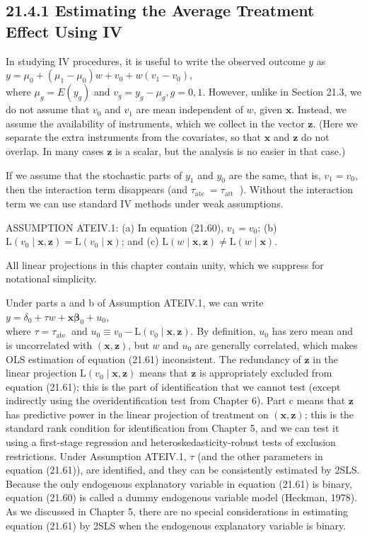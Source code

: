 \documentclass[10pt]{article}
\begin{document}
\subsection*{21.4.1 Estimating the Average Treatment Effect Using IV}
In studying IV procedures, it is useful to write the observed outcome $y$ as\\
$y=\mu_{0}+\left(\mu_{1}-\mu_{0}\right) w+v_{0}+w\left(v_{1}-v_{0}\right)$,\\
where $\mu_{g}=E\left(y_{g}\right)$ and $v_{g}=y_{g}-\mu_{g}, g=0,1$. However, unlike in Section 21.3, we do not assume that $v_{0}$ and $v_{1}$ are mean independent of $w$, given $\mathbf{x}$. Instead, we assume the availability of instruments, which we collect in the vector $\mathbf{z}$. (Here we separate the extra instruments from the covariates, so that $\mathbf{x}$ and $\mathbf{z}$ do not overlap. In many cases $\mathbf{z}$ is a scalar, but the analysis is no easier in that case.)

If we assume that the stochastic parts of $y_{1}$ and $y_{0}$ are the same, that is, $v_{1}=v_{0}$, then the interaction term disappears (and $\tau_{\text {ate }}=\tau_{\text {att }}$ ). Without the interaction term we can use standard IV methods under weak assumptions.

ASSUMPTION ATEIV.1: (a) In equation (21.60), $v_{1}=v_{0}$; (b) $\mathrm{L}\left(v_{0} \mid \mathbf{x}, \mathbf{z}\right)=\mathrm{L}\left(v_{0} \mid \mathbf{x}\right)$; and (c) $\mathrm{L}(w \mid \mathbf{x}, \mathbf{z}) \neq \mathrm{L}(w \mid \mathbf{x})$.

All linear projections in this chapter contain unity, which we suppress for notational simplicity.

Under parts a and b of Assumption ATEIV.1, we can write\\
$y=\delta_{0}+\tau w+\mathbf{x} \boldsymbol{\beta}_{0}+u_{0}$,\\
where $\tau=\tau_{\text {ate }}$ and $u_{0} \equiv v_{0}-\mathrm{L}\left(v_{0} \mid \mathbf{x}, \mathbf{z}\right)$. By definition, $u_{0}$ has zero mean and is uncorrelated with $(\mathbf{x}, \mathbf{z})$, but $w$ and $u_{0}$ are generally correlated, which makes OLS estimation of equation (21.61) inconsistent. The redundancy of $\mathbf{z}$ in the linear projection $\mathrm{L}\left(v_{0} \mid \mathbf{x}, \mathbf{z}\right)$ means that $\mathbf{z}$ is appropriately excluded from equation (21.61); this is the part of identification that we cannot test (except indirectly using the overidentification test from Chapter 6). Part c means that $\mathbf{z}$ has predictive power in the linear projection of treatment on $(\mathbf{x}, \mathbf{z})$; this is the standard rank condition for identification from Chapter 5, and we can test it using a first-stage regression and heteroskedasticity-robust tests of exclusion restrictions. Under Assumption ATEIV.1, $\tau$ (and the other parameters in equation (21.61)), are identified, and they can be consistently estimated by 2SLS. Because the only endogenous explanatory variable in equation (21.61) is binary, equation (21.60) is called a dummy endogenous variable model (Heckman, 1978). As we discussed in Chapter 5, there are no special considerations in estimating equation (21.61) by 2SLS when the endogenous explanatory variable is binary.
\end{document}
